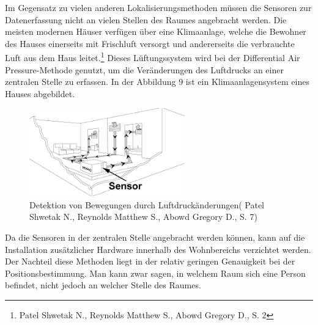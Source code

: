 Im Gegensatz zu vielen anderen Lokalisierungsmethoden müssen die Sensoren zur Datenerfassung nicht an vielen Stellen des Raumes angebracht werden. Die meisten modernen Häuser verfügen über eine Klimaanlage, welche die Bewohner des Hauses einerseits mit Frischluft versorgt und andererseits die verbrauchte Luft aus dem Haus leitet.\footnote{Patel Shwetak N., Reynolds Matthew S., Abowd Gregory D., S. 2} Dieses Lüftungssystem wird bei der Differential Air Pressure-Methode genutzt, um die Veränderungen des Luftdrucks an einer zentralen Stelle zu erfassen. In der Abbildung 9 ist ein Klimaanlagensystem eines Hauses abgebildet. 

\begin{figure}[H]
	\centering
	\includegraphics[width=0.6\textwidth]{pictures/dap_klima}
	\caption{Detektion von Bewegungen durch Luftdruckänderungen( Patel Shwetak N., Reynolds Matthew S., Abowd Gregory D., S. 7)}
\end{figure} 

Da die Sensoren in der zentralen Stelle angebracht werden können, kann auf die Installation zusätzlicher Hardware innerhalb des Wohnbereichs verzichtet werden. Der Nachteil diese Methoden liegt in der relativ geringen Genauigkeit bei der Positionsbestimmung. Man kann zwar sagen, in welchem Raum sich eine Person befindet, nicht jedoch an welcher Stelle des Raumes.

